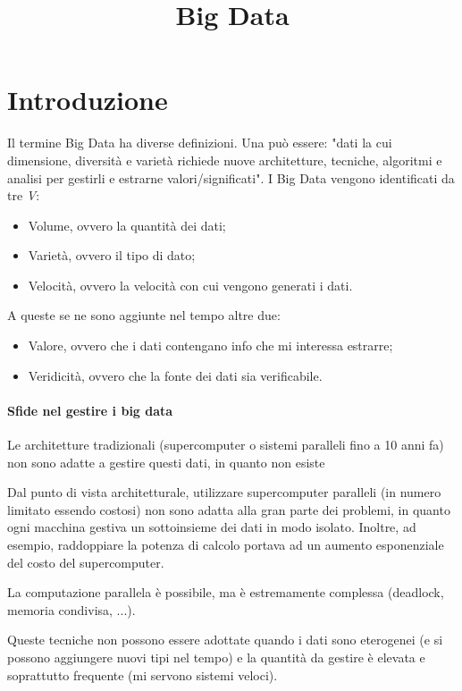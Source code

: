 \documentclass{article}
\title{Big Data}
\begin{document}
\maketitle

\section{Introduzione}
Il termine Big Data ha diverse definizioni. Una può essere: "dati la cui dimensione, diversità e varietà richiede nuove architetture, tecniche, algoritmi e analisi per gestirli e estrarne valori/significati". I Big Data vengono identificati da tre \textit{V}:
\begin{itemize}
    \item Volume, ovvero la quantità dei dati;
    \item Varietà, ovvero il tipo di dato;
    \item Velocità, ovvero la velocità con cui vengono generati i dati.
\end{itemize}
A queste se ne sono aggiunte nel tempo altre due:
\begin{itemize}
    \item Valore, ovvero che i dati contengano info che mi interessa estrarre;
    \item Veridicità, ovvero che la fonte dei dati sia verificabile.
\end{itemize}

\paragraph{Sfide nel gestire i big data} Le architetture tradizionali (supercomputer o sistemi paralleli fino a 10 anni fa) non sono adatte a gestire questi dati, in quanto non esiste 

\noindent Dal punto di vista architetturale, utilizzare supercomputer paralleli (in numero limitato essendo costosi) non sono adatta alla gran parte dei problemi, in quanto ogni macchina gestiva un sottoinsieme dei dati in modo isolato. Inoltre, ad esempio, raddoppiare la potenza di calcolo portava ad un aumento esponenziale del costo del supercomputer.

La computazione parallela è possibile, ma è estremamente complessa (deadlock, memoria condivisa, ...). 

Queste tecniche non possono essere adottate quando i dati sono eterogenei (e si possono aggiungere nuovi tipi nel tempo) e la quantità da gestire è elevata e soprattutto frequente (mi servono sistemi veloci). 
\end{document}

